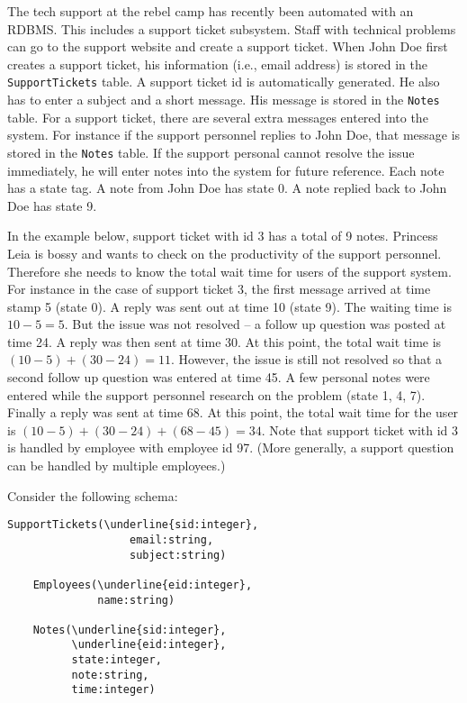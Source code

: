 The tech support at the rebel camp has recently been automated with an RDBMS.
This includes a support ticket subsystem.
Staff with technical problems can go to the support website and
create a support ticket.
When John Doe first creates a support ticket, his information (i.e., email address) is
stored in the \texttt{SupportTickets} table.
A support ticket id is automatically generated.
He also has to enter a subject and a short message.
His message is stored in the \texttt{Notes} table.
For a support ticket, there are several extra messages entered into the system.
For instance if the support personnel replies to John Doe, that message is stored in
the \texttt{Notes} table.
If the support personal cannot resolve the issue immediately, he will enter notes
into the system for future reference.
Each note has a state tag.
A note from John Doe has state 0.
A note replied back to John Doe has state 9.

In the example below, support ticket with id 3 has a total of 9 notes.
Princess Leia is bossy and wants to check on the productivity of the
support personnel.
Therefore she needs to know the total wait time for users of the support system.
For instance in the case of support ticket 3,
the first message arrived at time stamp 5 (state 0).
A reply was sent out at time 10 (state 9).
The waiting time is $10 - 5 = 5$.
But the issue was not resolved -- a follow up question was posted at time 24.
A reply was then sent at time 30.
At this point, the total wait time is $(10 - 5) + (30 - 24) = 11$.
However, the issue is still not resolved so that a second follow up question
was entered at time 45.
A few personal notes were entered while the support personnel research on the problem
(state 1, 4, 7).
Finally a reply was sent at time 68.
At this point, the total wait time for the user is $(10-5) + (30 - 24) + (68 - 45) = 34$.
Note that support ticket with id 3 is handled by employee with employee id 97.
(More generally, a support question can be handled by multiple employees.)

Consider the following schema:
\begin{Verbatim}[commandchars=\\\{\}]
    SupportTickets(\underline{sid:integer},
                   email:string,
                   subject:string)
                   
    Employees(\underline{eid:integer},
              name:string)
              
    Notes(\underline{sid:integer},
          \underline{eid:integer},
          state:integer,
          note:string,
          time:integer)
\end{Verbatim}

